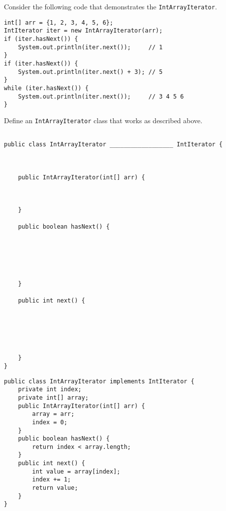 \question Consider the following code that demonstrates the \lstinline$IntArrayIterator$.
\begin{lstlisting}
int[] arr = {1, 2, 3, 4, 5, 6};
IntIterator iter = new IntArrayIterator(arr);
if (iter.hasNext()) {
    System.out.println(iter.next());     // 1
}
if (iter.hasNext()) {
    System.out.println(iter.next() + 3); // 5
}
while (iter.hasNext()) {
    System.out.println(iter.next());     // 3 4 5 6
}

\end{lstlisting}
\clearpage
Define an \lstinline$IntArrayIterator$ class that works as described above.
\ifprintanswers\else
\begin{lstlisting}

public class IntArrayIterator __________________ IntIterator {



    public IntArrayIterator(int[] arr) {



    }
    
    public boolean hasNext() {






    }
    
    public int next() {
    
    
    
    
    
    
    }
}
\end{lstlisting}
\fi
\begin{solution}[3in]
\begin{lstlisting}
public class IntArrayIterator implements IntIterator {
    private int index;
    private int[] array;
    public IntArrayIterator(int[] arr) {
        array = arr;
        index = 0;
    }
    public boolean hasNext() {
        return index < array.length;
    }
    public int next() {
        int value = array[index];
        index += 1;
        return value;
    }
}
\end{lstlisting}
\end{solution}
